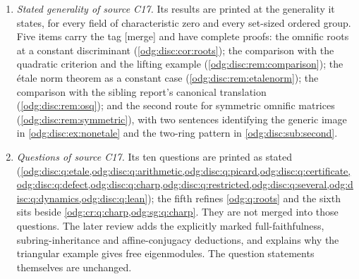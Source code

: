 \documentclass[11pt,oneside]{article}
\numberwithin{equation}{section}
\theoremstyle{definition}
\theoremstyle{remark}
\newcommand{\mergetag}{\textup{\textsf{\small[merge]}}}
\begin{document}
\begin{enumerate}[leftmargin=*]
\cref{odg:disc:lem:certificate}.
\item \emph{Stated generality of source C17.} Its results are printed at the generality it
states, for every field of characteristic zero and every set-sized ordered group. Five items
carry the tag \mergetag{} and have complete proofs: the omnific roots at a constant
discriminant (\cref{odg:disc:cor:roots}); the comparison with the quadratic criterion and the
lifting example (\cref{odg:disc:rem:comparison}); the \'etale norm theorem as a constant case
(\cref{odg:disc:rem:etalenorm}); the comparison with the sibling report's canonical
translation (\cref{odg:disc:rem:osq}); and the second route for symmetric omnific matrices
(\cref{odg:disc:rem:symmetric}), with two sentences identifying the generic image in
\cref{odg:disc:ex:nonetale} and the two-ring pattern in \cref{odg:disc:sub:second}.
\item \emph{Questions of source C17.} Its ten questions are printed as stated
(\cref{odg:disc:q:etale,odg:disc:q:arithmetic,odg:disc:q:picard,odg:disc:q:certificate,odg:disc:q:defect,odg:disc:q:charp,odg:disc:q:restricted,odg:disc:q:several,odg:disc:q:dynamics,odg:disc:q:lean});
the fifth refines \cref{odg:q:roots} and the sixth sits beside
\cref{odg:cr:q:charp,odg:sg:q:charp}. They are not merged into those questions.
The later review adds the explicitly marked full-faithfulness, subring-inheritance
and affine-conjugacy deductions, and explains why the triangular example gives free
eigenmodules. The question statements themselves are unchanged.
\end{enumerate}
\end{document}
